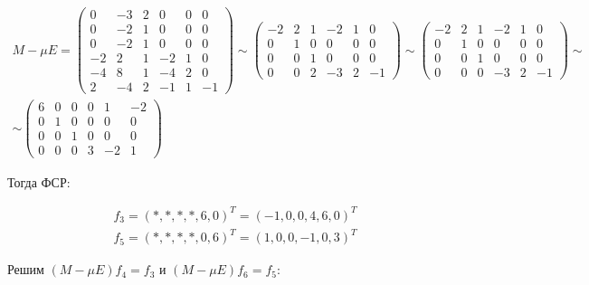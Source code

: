 \documentclass[11pt]{article}
\begin{document}
$$
\begin{gathered}
M - \mu E =
\begin{pmatrix}
0 & -3 & 2 & 0 & 0 & 0 \\
0 & -2 & 1 & 0 & 0 & 0 \\
0 & -2 & 1 & 0 & 0 & 0 \\
-2 & 2 & 1 & -2 & 1 & 0 \\
-4 & 8 & 1 & -4 & 2 & 0 \\
2 & -4 & 2 & -1 & 1 & -1
\end{pmatrix} \sim
\begin{pmatrix}
-2 & 2 & 1 & -2 & 1 & 0 \\
0 & 1 & 0 & 0 & 0 & 0 \\
0 & 0 & 1 & 0 & 0 & 0 \\
0 & 0 & 2 & -3 & 2 & -1
\end{pmatrix} \sim
\begin{pmatrix}
-2 & 2 & 1 & -2 & 1 & 0 \\
0 & 1 & 0 & 0 & 0 & 0 \\
0 & 0 & 1 & 0 & 0 & 0 \\
0 & 0 & 0 & -3 & 2 & -1
\end{pmatrix} \sim \\[6pt] \sim
\begin{pmatrix}
6 & 0 & 0 & 0 & 1 & -2 \\
0 & 1 & 0 & 0 & 0 & 0 \\
0 & 0 & 1 & 0 & 0 & 0 \\
0 & 0 & 0 & 3 & -2 & 1
\end{pmatrix}
\end{gathered}
$$

Тогда ФСР:

$$
\begin{array}{}
f_3 = (*, *, *, *, 6, 0)^T = (-1, 0, 0, 4, 6, 0)^T \\[6pt]
f_5 = (*, *, *, *, 0, 6)^T = (1, 0, 0, -1, 0, 3)^T
\end{array}
$$

Решим $(M - \mu E)f_4 = f_3$ и $(M - \mu E)f_6 = f_5$:
\end{document}
